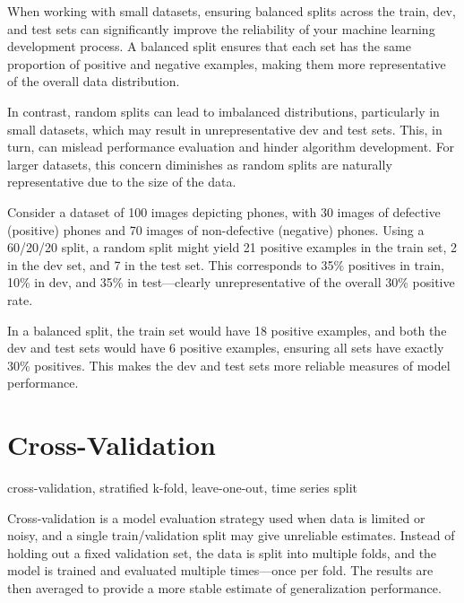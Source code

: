 \documentclass[12pt,openany, draft]{book}
\begin{document}
When working with small datasets, ensuring balanced splits across the train, dev, and test sets can significantly improve the reliability of your machine learning development process. A balanced split ensures that each set has the same proportion of positive and negative examples, making them more representative of the overall data distribution. \newline

In contrast, random splits can lead to imbalanced distributions, particularly in small datasets, which may result in unrepresentative dev and test sets. This, in turn, can mislead performance evaluation and hinder algorithm development. For larger datasets, this concern diminishes as random splits are naturally representative due to the size of the data.

\begin{examplebox}
Consider a dataset of 100 images depicting phones, with 30 images of defective (positive) phones and 70 images of non-defective (negative) phones. Using a 60/20/20 split, a random split might yield 21 positive examples in the train set, 2 in the dev set, and 7 in the test set. This corresponds to 35\% positives in train, 10\% in dev, and 35\% in test—clearly unrepresentative of the overall 30\% positive rate.

In a balanced split, the train set would have 18 positive examples, and both the dev and test sets would have 6 positive examples, ensuring all sets have exactly 30\% positives. This makes the dev and test sets more reliable measures of model performance.
\end{examplebox}




\section{Cross-Validation}

\begin{keywordsbox}
cross-validation, stratified k-fold, leave-one-out, time series split
\end{keywordsbox}

Cross-validation is a model evaluation strategy used when data is limited or noisy, and a single train/validation split may give unreliable estimates. Instead of holding out a fixed validation set, the data is split into multiple folds, and the model is trained and evaluated multiple times—once per fold. The results are then averaged to provide a more stable estimate of generalization performance. 
\newline
\end{document}

